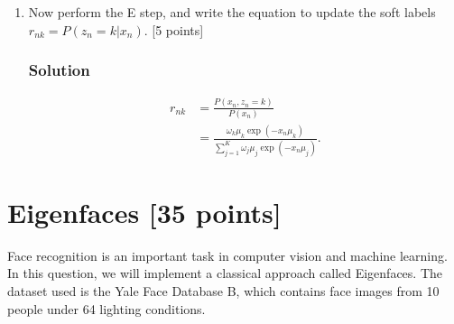 \documentclass{article}
\begin{document}
\begin{enumerate}[label=(\alph*)]
    
    \item Now perform the E step, and write the equation to update the soft labels $r_{nk} = P(z_n = k|x_n)$. [5 points]
    \subsubsection*{Solution}
    
    \begin{align*}
    r_{nk} &= \frac{P(x_n, z_n = k)}{P(x_n)} \\
    &= \frac{\omega_k \mu_k \exp(-x_n \mu_k)}{\sum_{j=1}^K \omega_j \mu_j \exp(-x_n \mu_j)}.
    \end{align*}
\end{enumerate}


\clearpage

\section{Eigenfaces [35 points]}

Face recognition is an important task in computer vision and machine learning. In this question, we will implement a classical approach called Eigenfaces. The dataset used is the Yale Face Database B, which contains face images from 10 people under 64 lighting conditions.
\end{document}
